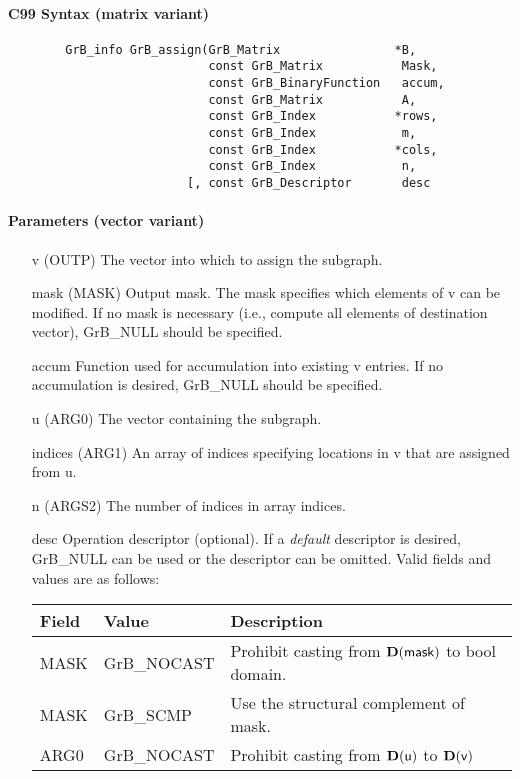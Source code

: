 \paragraph{C99 Syntax (matrix variant)}

\begin{verbatim}
        GrB_info GrB_assign(GrB_Matrix                *B,
                            const GrB_Matrix           Mask,
                            const GrB_BinaryFunction   accum,
                            const GrB_Matrix           A,
                            const GrB_Index           *rows,
                            const GrB_Index            m,
                            const GrB_Index           *cols,
                            const GrB_Index            n,
                         [, const GrB_Descriptor       desc
\end{verbatim}

\paragraph{Parameters (vector variant)}

\begin{itemize}[leftmargin=1.1in]
    \item[{\sf v}]   ({\sf OUTP}) The vector into which to assign the subgraph.
    \item[{\sf mask}] ({\sf MASK}) Output mask. The mask specifies which elements
    of {\sf v} can be modified. If no mask is necessary (i.e., compute all
    elements of destination vector), {\sf GrB\_NULL} should be specified.
    \item[{\sf accum}] Function used for accumulation into existing {\sf v} entries.  If no accumulation
                        is desired, {\sf GrB\_NULL} should be specified.
    \item[{\sf u}]   ({\sf ARG0}) The vector containing the subgraph.
    \item[{\sf indices}]     ({\sf ARG1}) An array of indices specifying locations in {\sf v} that
                       are assigned from {\sf u}.
    \item[{\sf n}]    ({\sf ARGS2}) The number of indices in array {\sf indices}.
    \item[{\sf desc}]   Operation descriptor (optional). If a
    \emph{default} descriptor is desired, {\sf GrB\_NULL} can be
    used or the descriptor can be omitted.  Valid fields and values are as follows: \\
    \begin{tabular}{lll}
    Field  & Value & Description \\
    \hline
    {\sf MASK} & {\sf GrB\_NOCAST} & Prohibit casting from $\bold{D}({\sf mask})$ to {\sf bool} domain. \\
    {\sf MASK} & {\sf GrB\_SCMP} & Use the structural complement of {\sf mask}. \\
    {\sf ARG0} & {\sf GrB\_NOCAST} & Prohibit casting from $\bold{D}({\sf u})$ to $\bold{D}({\sf v})$ \\
    \end{tabular}
\end{itemize}

